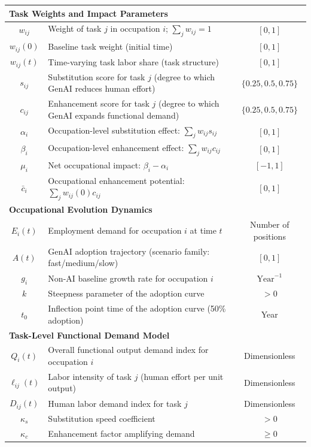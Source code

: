 \begin{longtable}{clc}
\multicolumn{3}{l}{\textbf{Task Weights and Impact Parameters}} \\
\midrule
$w_{ij}$ & Weight of task $j$ in occupation $i$; $\sum_j w_{ij}=1$ & $[0,1]$ \\
$w_{ij}(0)$ & Baseline task weight (initial time) & $[0,1]$ \\
$w_{ij}(t)$ & Time-varying task labor share (task structure) & $[0,1]$ \\
$s_{ij}$ & Substitution score for task $j$ (degree to which GenAI reduces human effort) & $\{0.25,0.5,0.75\}$ \\
$c_{ij}$ & Enhancement score for task $j$ (degree to which GenAI expands functional demand) & $\{0.25,0.5,0.75\}$ \\
$\alpha_i$ & Occupation-level substitution effect: $\sum_j w_{ij}s_{ij}$ & $[0,1]$ \\
$\beta_i$ & Occupation-level enhancement effect: $\sum_j w_{ij}c_{ij}$ & $[0,1]$ \\
$\mu_i$ & Net occupational impact: $\beta_i-\alpha_i$ & $[-1,1]$ \\
$\bar c_i$ & Occupational enhancement potential: $\sum_j w_{ij}(0) c_{ij}$ & $[0,1]$ \\
\midrule

\multicolumn{3}{l}{\textbf{Occupational Evolution Dynamics}} \\
\midrule
$E_i(t)$ & Employment demand for occupation $i$ at time $t$ & Number of positions \\
$A(t)$ & GenAI adoption trajectory (scenario family: fast/medium/slow) & $[0,1]$ \\
$g_i$ & Non-AI baseline growth rate for occupation $i$ & $\text{Year}^{-1}$ \\
$k$ & Steepness parameter of the adoption curve & $>0$ \\
$t_0$ & Inflection point time of the adoption curve (50\% adoption) & Year \\
\midrule

\multicolumn{3}{l}{\textbf{Task-Level Functional Demand Model}} \\
\midrule
$Q_i(t)$ & Overall functional output demand index for occupation $i$ & Dimensionless \\
$\ell_{ij}(t)$ & Labor intensity of task $j$ (human effort per unit output) & Dimensionless \\
$D_{ij}(t)$ & Human labor demand index for task $j$ & Dimensionless \\
$\kappa_s$ & Substitution speed coefficient & $>0$ \\
$\kappa_c$ & Enhancement factor amplifying demand & $\ge 0$ \\
\midrule


\end{longtable}
